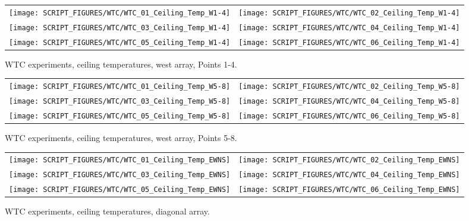 \begin{figure}[p]
\begin{tabular*}{\textwidth}{l@{\extracolsep{\fill}}r}
\texttt{[image: SCRIPT\_FIGURES/WTC/WTC\_01\_Ceiling\_Temp\_W1-4]} &
\texttt{[image: SCRIPT\_FIGURES/WTC/WTC\_02\_Ceiling\_Temp\_W1-4]} \\
\texttt{[image: SCRIPT\_FIGURES/WTC/WTC\_03\_Ceiling\_Temp\_W1-4]} &
\texttt{[image: SCRIPT\_FIGURES/WTC/WTC\_04\_Ceiling\_Temp\_W1-4]} \\
\texttt{[image: SCRIPT\_FIGURES/WTC/WTC\_05\_Ceiling\_Temp\_W1-4]} &
\texttt{[image: SCRIPT\_FIGURES/WTC/WTC\_06\_Ceiling\_Temp\_W1-4]}
\end{tabular*}
\caption{WTC experiments, ceiling temperatures, west array, Points 1-4.}
\label{NIST_WTC_Ceiling_W1-4}
\end{figure}

\begin{figure}[p]
\begin{tabular*}{\textwidth}{l@{\extracolsep{\fill}}r}
\texttt{[image: SCRIPT\_FIGURES/WTC/WTC\_01\_Ceiling\_Temp\_W5-8]} &
\texttt{[image: SCRIPT\_FIGURES/WTC/WTC\_02\_Ceiling\_Temp\_W5-8]} \\
\texttt{[image: SCRIPT\_FIGURES/WTC/WTC\_03\_Ceiling\_Temp\_W5-8]} &
\texttt{[image: SCRIPT\_FIGURES/WTC/WTC\_04\_Ceiling\_Temp\_W5-8]} \\
\texttt{[image: SCRIPT\_FIGURES/WTC/WTC\_05\_Ceiling\_Temp\_W5-8]} &
\texttt{[image: SCRIPT\_FIGURES/WTC/WTC\_06\_Ceiling\_Temp\_W5-8]}
\end{tabular*}
\caption{WTC experiments, ceiling temperatures, west array, Points 5-8.}
\label{NIST_WTC_Ceiling_W5-8}
\end{figure}

\begin{figure}[p]
\begin{tabular*}{\textwidth}{l@{\extracolsep{\fill}}r}
\texttt{[image: SCRIPT\_FIGURES/WTC/WTC\_01\_Ceiling\_Temp\_EWNS]} &
\texttt{[image: SCRIPT\_FIGURES/WTC/WTC\_02\_Ceiling\_Temp\_EWNS]} \\
\texttt{[image: SCRIPT\_FIGURES/WTC/WTC\_03\_Ceiling\_Temp\_EWNS]} &
\texttt{[image: SCRIPT\_FIGURES/WTC/WTC\_04\_Ceiling\_Temp\_EWNS]} \\
\texttt{[image: SCRIPT\_FIGURES/WTC/WTC\_05\_Ceiling\_Temp\_EWNS]} &
\texttt{[image: SCRIPT\_FIGURES/WTC/WTC\_06\_Ceiling\_Temp\_EWNS]}
\end{tabular*}
\caption{WTC experiments, ceiling temperatures, diagonal array.}
\label{NIST_WTC_Ceiling_EWNS}
\end{figure}


